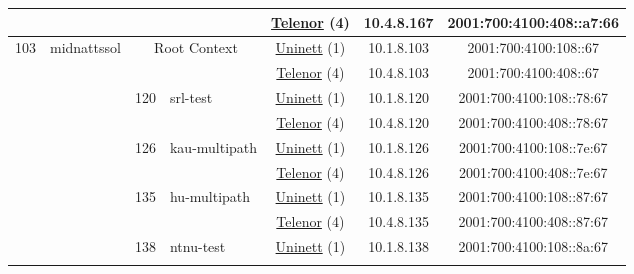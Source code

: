 \begin{small}
\begin{center}
\begin{longtable}{|c|c|c|c|c|c|c|c|}
  &  &  &  & \multicolumn{2}{|c|}{\tiny{\href{https://www.telenor.no}{Telenor} (4)}} & \tiny{10.4.8.167} & \tiny{2001:700:4100:408::a7:66} \\ \hline
 \multirow{16}{*}{\tiny{103}} & \multicolumn{1}{|l|}{\multirow{16}{*}{\tiny{midnattssol}}} & \multicolumn{2}{|c|}{\multirow{2}{*}{\tiny{Root Context}}} & \multicolumn{2}{|c|}{\tiny{\href{https://www.uninett.no}{Uninett} (1)}} & \tiny{10.1.8.103} & \tiny{2001:700:4100:108::67} \\* \cline{5-5}\cline{6-6}\cline{7-7}\cline{8-8}
  &  & \multicolumn{2}{|c|}{} & \multicolumn{2}{|c|}{\tiny{\href{https://www.telenor.no}{Telenor} (4)}} & \tiny{10.4.8.103} & \tiny{2001:700:4100:408::67} \\* \cline{3-3}\cline{4-4}\cline{5-5}\cline{6-6}\cline{7-7}\cline{8-8}
  &  & \multirow{2}{*}{\tiny{120}} & \multicolumn{1}{|l|}{\multirow{2}{*}{\tiny{srl-test}}} & \multicolumn{2}{|c|}{\tiny{\href{https://www.uninett.no}{Uninett} (1)}} & \tiny{10.1.8.120} & \tiny{2001:700:4100:108::78:67} \\* \cline{5-5}\cline{6-6}\cline{7-7}\cline{8-8}
  &  &  &  & \multicolumn{2}{|c|}{\tiny{\href{https://www.telenor.no}{Telenor} (4)}} & \tiny{10.4.8.120} & \tiny{2001:700:4100:408::78:67} \\* \cline{3-3}\cline{4-4}\cline{5-5}\cline{6-6}\cline{7-7}\cline{8-8}
  &  & \multirow{2}{*}{\tiny{126}} & \multicolumn{1}{|l|}{\multirow{2}{*}{\tiny{kau-multipath}}} & \multicolumn{2}{|c|}{\tiny{\href{https://www.uninett.no}{Uninett} (1)}} & \tiny{10.1.8.126} & \tiny{2001:700:4100:108::7e:67} \\* \cline{5-5}\cline{6-6}\cline{7-7}\cline{8-8}
  &  &  &  & \multicolumn{2}{|c|}{\tiny{\href{https://www.telenor.no}{Telenor} (4)}} & \tiny{10.4.8.126} & \tiny{2001:700:4100:408::7e:67} \\* \cline{3-3}\cline{4-4}\cline{5-5}\cline{6-6}\cline{7-7}\cline{8-8}
  &  & \multirow{2}{*}{\tiny{135}} & \multicolumn{1}{|l|}{\multirow{2}{*}{\tiny{hu-multipath}}} & \multicolumn{2}{|c|}{\tiny{\href{https://www.uninett.no}{Uninett} (1)}} & \tiny{10.1.8.135} & \tiny{2001:700:4100:108::87:67} \\* \cline{5-5}\cline{6-6}\cline{7-7}\cline{8-8}
  &  &  &  & \multicolumn{2}{|c|}{\tiny{\href{https://www.telenor.no}{Telenor} (4)}} & \tiny{10.4.8.135} & \tiny{2001:700:4100:408::87:67} \\* \cline{3-3}\cline{4-4}\cline{5-5}\cline{6-6}\cline{7-7}\cline{8-8}
  &  & \multirow{2}{*}{\tiny{138}} & \multicolumn{1}{|l|}{\multirow{2}{*}{\tiny{ntnu-test}}} & \multicolumn{2}{|c|}{\tiny{\href{https://www.uninett.no}{Uninett} (1)}} & \tiny{10.1.8.138} & \tiny{2001:700:4100:108::8a:67} \\* \cline{5-5}\cline{6-6}\cline{7-7}\cline{8-8}

\end{longtable}
\end{center}
\end{small}
